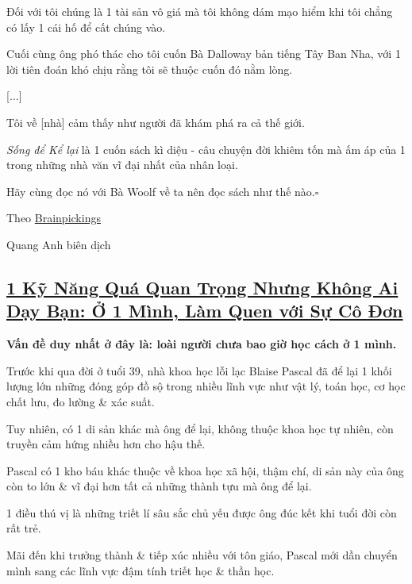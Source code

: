 \documentclass{article}
\begin{document}
%
Đối với tôi chúng là 1 tài sản vô giá mà tôi không dám mạo hiểm khi tôi chẳng có lấy 1 cái hố để cất chúng vào.

Cuối cùng ông phó thác cho tôi cuốn Bà Dalloway bản tiếng Tây Ban Nha, với 1 lời tiên đoán khó chịu rằng tôi sẽ thuộc cuốn đó nằm lòng.

[$\ldots$]

%
Tôi về [nhà] cảm thấy như người đã khám phá ra cả thế giới.

%
\textit{Sống để Kể lại} là 1 cuốn sách kì diệu - câu chuyện đời khiêm tốn mà ấm áp của 1 trong những nhà văn vĩ đại nhất của nhân loại.

Hãy cùng đọc nó với Bà Woolf về ta nên đọc sách như thế nào.\hfill$\square$

\begin{flushright}
	Theo \href{https://www.brainpickings.org/2015/04/06/marquez-favorite-books/?fbclid=IwAR0JImPeIOfnzQxVa-czES1VWLGVG-kyYEdAQm6O2yl0DAJvyrA6V-kO08s}{Brainpickings}
	
	Quang Anh biên dịch
\end{flushright}


\subsection{\href{http://tramdoc.vn/tin-tuc/mot-ki-nang-qua-quan-trong-nhung-khong-ai-day-ban-o-mot-minh-lam-quen-voi-su-co-don-nyV68W.html}{1 Kỹ Năng Quá Quan Trọng Nhưng Không Ai Dạy Bạn: Ở 1 Mình, Làm Quen với Sự Cô Đơn}}

\textbf{Vấn đề duy nhất ở đây là: loài người chưa bao giờ học cách ở 1 mình.}

%
Trước khi qua đời ở tuổi 39, nhà khoa học lỗi lạc Blaise Pascal đã để lại 1 khối lượng lớn những đóng góp đồ sộ trong nhiều lĩnh vực như vật lý, toán học, cơ học chất lưu, đo lường \& xác suất.

%
Tuy nhiên, có 1 di sản khác mà ông để lại, không thuộc khoa học tự nhiên, còn truyền cảm hứng nhiều hơn cho hậu thế.

Pascal có 1 kho báu khác thuộc về khoa học xã hội, thậm chí, di sản này của ông còn to lớn \& vĩ đại hơn tất cả những thành tựu mà ông để lại.

%
1 điều thú vị là những triết lí sâu sắc chủ yếu được ông đúc kết khi tuổi đời còn rất trẻ.

Mãi đến khi trưởng thành \& tiếp xúc nhiều với tôn giáo, Pascal mới dần chuyển mình sang các lĩnh vực đậm tính triết học \& thần học. 
\end{document}
